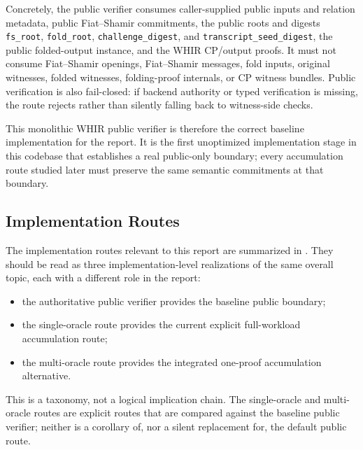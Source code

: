 \documentclass[11pt]{article}
\theoremstyle{definition}
\begin{document}
Concretely, the public verifier consumes caller-supplied public inputs and
relation metadata, public Fiat--Shamir commitments, the public roots and digests
\texttt{fs\_root}, \texttt{fold\_root}, \texttt{challenge\_digest}, and
\texttt{transcript\_seed\_digest}, the public folded-output instance, and the
WHIR CP/output proofs. It must not consume Fiat--Shamir openings, Fiat--Shamir
messages, fold inputs, original witnesses, folded witnesses, folding-proof
internals, or CP witness bundles. Public verification is also fail-closed: if
backend authority or typed verification is missing, the route rejects rather
than silently falling back to witness-side checks.

This monolithic WHIR public verifier is therefore the correct baseline
implementation for the report. It is the first unoptimized implementation stage
in this codebase that establishes a real public-only boundary; every
accumulation route studied later must preserve the same semantic commitments at
that boundary.

\subsection{Implementation Routes}
\label{sec:implementation-routes}
The implementation routes relevant to this report are summarized in
. They should be read as three implementation-level
realizations of the same overall topic, each with a different role in the
report:
\begin{itemize}
  \item the authoritative public verifier provides the baseline public boundary;
  \item the single-oracle route provides the current explicit full-workload
  accumulation route;
  \item the multi-oracle route provides the integrated one-proof accumulation
  alternative.
\end{itemize}
This is a taxonomy, not a logical implication chain. The single-oracle and
multi-oracle routes are explicit routes that are compared against the baseline
public verifier; neither is a corollary of, nor a silent replacement for, the
default public route.
\end{document}

